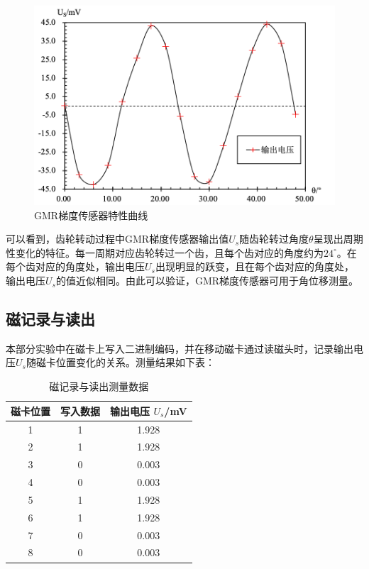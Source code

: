 \documentclass{thuemp}
\begin{document}
\begin{figure}[H]
    \centering
    \includegraphics[width=0.9\linewidth]{../Data/GMR-Plot-05-excel.png}
    \caption{GMR梯度传感器特性曲线} \label{fig:gmr_gradient}
\end{figure}

可以看到，齿轮转动过程中GMR梯度传感器输出值$U_s$随齿轮转过角度$\theta$呈现出周期性变化的特征。每一周期对应齿轮转过一个齿，且每个齿对应的角度约为$24^\circ$。在每个齿对应的角度处，输出电压$U_s$出现明显的跃变，且在每个齿对应的角度处，输出电压$U_s$的值近似相同。由此可以验证，GMR梯度传感器可用于角位移测量。

\subsection{磁记录与读出}

本部分实验中在磁卡上写入二进制编码，并在移动磁卡通过读磁头时，记录输出电压$U_s$随磁卡位置变化的关系。测量结果如下表：

\begin{table}[H]
    \centering
    \captionnamefont{\wuhao\bf\heiti}
    \captiontitlefont{\wuhao\bf\heiti}
    \caption{磁记录与读出测量数据} \label{tab:magnetic_record}
    \liuhao
    \begin{tabular}{ccc}
        \toprule
        磁卡位置 & 写入数据& 输出电压 $U_s$/\si{\milli\volt} \\
        \midrule
        1 & 1 & 1.928 \\ 
        2 & 1 & 1.928 \\ 
        3 & 0 & 0.003 \\ 
        4 & 0 & 0.003 \\ 
        5 & 1 & 1.928 \\ 
        6 & 1 & 1.928 \\ 
        7 & 0 & 0.003 \\ 
        8 & 0 & 0.003 \\ 
        \bottomrule
    \end{tabular}
\end{table}
\end{document}
